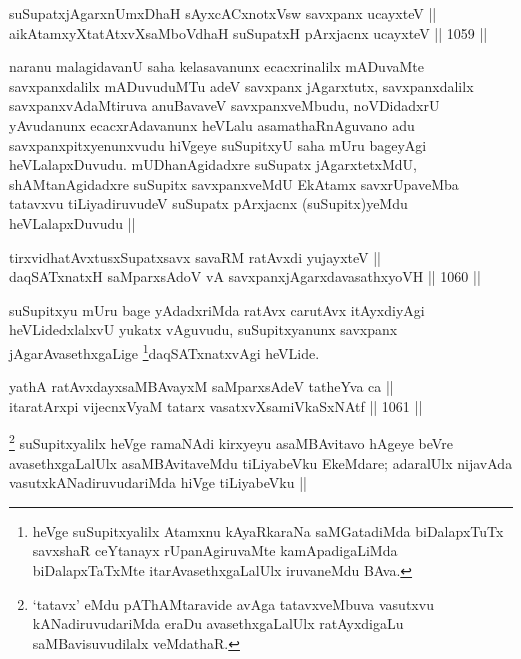 \begin{shl}
suSupatxjAgarxnUmxDhaH sAyxcACxnotxV\s sw savxpanx ucayxteV || \\
aikAtamxyXtatAtxvXsaMboVdhaH suSupatxH pArxjacnx ucayxteV ||  1059 ||  
\end{shl}

\begin{artha}
naranu malagidavanU saha kelasavanunx ecacxrinalilx mADuvaMte savxpanxdalilx mADuvuduMTu adeV savxpanx jAgarxtutx, savxpanxdalilx savxpanxvAdaMtiruva anuBavaveV savxpanxveMbudu, noVDidadxrU yAvudanunx ecacxrAdavanunx heVLalu asamathaRnAguvano adu savxpanxpitxyenunxvudu hiVgeye suSupitxyU saha mUru bageyAgi heVLalapxDuvudu. mUDhanAgidadxre suSupatx jAgarxtetxMdU, shAMtanAgidadxre suSupitx savxpanxveMdU EkAtamx savxrUpaveMba tatavxvu tiLiyadiruvudeV suSupatx pArxjacnx (suSupitx)yeMdu heVLalapxDuvudu ||
\end{artha}


\begin{shl}
tirxvidhatAvxtusxSupatxsavx savaRM ratAvxdi yujayxteV || \\
daqSATxnatxH saMparxsAdoV vA savxpanxjAgarxdavasathxyoVH ||  1060 ||  
\end{shl}

\begin{artha}
suSupitxyu mUru bage yAdadxriMda ratAvx carutAvx itAyxdiyAgi heVLidedxlalxvU yukatx vAguvudu, suSupitxyanunx savxpanx jAgarAvasethxgaLige \footnote{heVge suSupitxyalilx Atamxnu kAyaRkaraNa saMGatadiMda biDalapxTuTx savxshaR ceYtanayx rUpanAgiruvaMte kamApadigaLiMda biDalapxTaTxMte itarAvasethxgaLalUlx iruvaneMdu BAva.}daqSATxnatxvAgi heVLide.
\end{artha}


\begin{shl}
yathA ratAvxdayxsaMBAvayxM saMparxsAdeV tatheYva ca || \\
itaratArxpi vijecnxVyaM tatarx vasatxvXsamiVkaSxNAtf ||  1061 ||  
\end{shl}

\begin{artha}
\footnote{`tatavx' eMdu pAThAMtaravide avAga tatavxveMbuva vasutxvu kANadiruvudariMda eraDu avasethxgaLalUlx ratAyxdigaLu saMBavisuvudilalx veMdathaR.}
suSupitxyalilx heVge ramaNAdi kirxyeyu asaMBAvitavo hAgeye beVre avasethxgaLalUlx asaMBAvitaveMdu tiLiyabeVku EkeMdare; adaralUlx nijavAda vasutxkANadiruvudariMda hiVge tiLiyabeVku ||
\end{artha}

